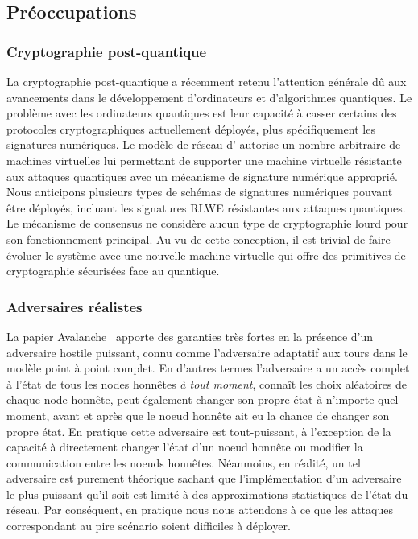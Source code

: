 \documentclass[runningheads]{llncs}
\begin{document}
\subsection{Préoccupations}
\subsubsection{Cryptographie post-quantique}
La cryptographie post-quantique a récemment retenu l'attention générale dû aux avancements dans le développement
d'ordinateurs et d'algorithmes quantiques. Le problème avec les ordinateurs quantiques est leur capacité à casser
certains des protocoles cryptographiques actuellement déployés, plus spécifiquement les signatures numériques. Le modèle
de réseau d'\AVAPlatformName{} autorise un nombre arbitraire de machines virtuelles lui permettant de supporter une
machine virtuelle résistante aux attaques quantiques avec un mécanisme de signature numérique approprié. Nous
anticipons plusieurs types de schémas de signatures numériques pouvant être déployés, incluant les signatures RLWE
résistantes aux attaques quantiques. Le mécanisme de consensus ne considère aucun type de cryptographie lourd pour son
fonctionnement principal. Au vu de cette conception, il est trivial de faire évoluer le système avec une nouvelle
machine virtuelle qui offre des primitives de cryptographie sécurisées face au quantique.

\subsubsection{Adversaires réalistes}
La papier Avalanche~\cite{avalanche} apporte des garanties très fortes en la présence d'un adversaire hostile puissant,
connu comme l'adversaire adaptatif aux tours dans le modèle point à point complet. En d'autres termes l'adversaire a un
accès complet à l'état de tous les nodes honnêtes \emph{à tout moment}, connaît les choix aléatoires de chaque node
honnête, peut également changer son propre état à n'importe quel moment, avant et après que le noeud honnête ait eu la
chance de changer son propre état. En pratique cette adversaire est tout-puissant, à l'exception de la capacité à
directement changer l'état d'un noeud honnête ou modifier la communication entre les noeuds honnêtes. Néanmoins, en
réalité, un tel adversaire est purement théorique sachant que l'implémentation d'un adversaire le plus puissant qu'il
soit est limité à des approximations statistiques de l'état du réseau. Par conséquent, en pratique nous nous attendons
à ce que les attaques correspondant au pire scénario soient difficiles à déployer.
\end{document}
